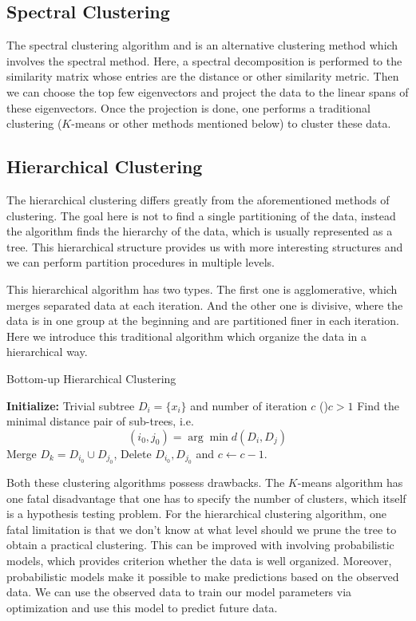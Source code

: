 \subsection{Spectral Clustering}

The spectral clustering algorithm \cite{spec0} and \cite{spec} is an alternative clustering method which involves the spectral method. Here, a spectral decomposition is performed to the similarity matrix whose entries are the distance or other similarity metric. Then we can choose the top few eigenvectors and project the data to the linear spans of these eigenvectors. Once the projection is done, one performs a traditional clustering ($K$-means or other methods mentioned below) to cluster these data.

\subsection{Hierarchical Clustering}

The hierarchical clustering differs greatly from the aforementioned methods of clustering. The goal here is not to find a single partitioning of the data, instead the algorithm finds the hierarchy of the data, which is usually represented as a tree. This hierarchical structure provides us with more interesting structures and we can perform partition procedures in multiple levels. 

This hierarchical algorithm has two types. The first one is agglomerative, which merges separated data at each iteration. And the other one is divisive, where the data is in one group at the beginning and are partitioned finer in each iteration. Here we introduce this traditional algorithm which organize the data in a hierarchical way. 

\begin{algorithm}
\caption{Bottom-up Hierarchical Clustering}
\textbf{Initialize:}  Trivial subtree $D_i=\{x_i\}$ and number of iteration $c$\;
\While(){$c>1$}{
Find the minimal distance pair of sub-trees, i.e.
\begin{equation*}
    (i_0,j_0)=\arg\min d(D_i,D_j)
\end{equation*}
Merge $D_k= D_{i_0} \cup D_{j_0}$, Delete $D_{i_0}, D_{j_0}$ and $c\leftarrow c-1$. 
}
\end{algorithm}

Both these clustering algorithms possess drawbacks. The $K$-means algorithm has one fatal disadvantage that one has to specify the number of clusters, which itself is a hypothesis testing problem. For the hierarchical clustering algorithm, one fatal limitation is that we don't know at what level should we prune the tree to obtain a practical clustering. This can be improved with involving probabilistic models, which provides criterion whether the data is well organized. Moreover, probabilistic models make it possible to make predictions based on the observed data. We can use the observed data to train our model parameters via optimization and use this model to predict future data. 

